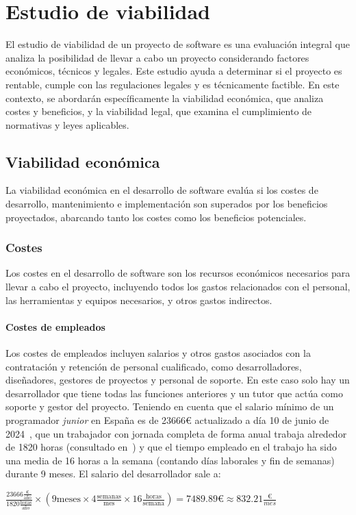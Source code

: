\section{Estudio de viabilidad}
El estudio de viabilidad de un proyecto de software es una evaluación integral que analiza la posibilidad de llevar a cabo un proyecto considerando factores económicos, técnicos y legales. Este estudio ayuda a determinar si el proyecto es rentable, cumple con las regulaciones legales y es técnicamente factible. En este contexto, se abordarán específicamente la viabilidad económica, que analiza costes y beneficios, y la viabilidad legal, que examina el cumplimiento de normativas y leyes aplicables.

\subsection{Viabilidad económica}
La viabilidad económica en el desarrollo de software evalúa si los costes de desarrollo, mantenimiento e implementación son superados por los beneficios proyectados, abarcando tanto los costes como los beneficios potenciales.

\subsubsection{Costes}
Los costes en el desarrollo de software son los recursos económicos necesarios para llevar a cabo el proyecto, incluyendo todos los gastos relacionados con el personal, las herramientas y equipos necesarios, y otros gastos indirectos.

\paragraph{Costes de empleados}

Los costes de empleados incluyen salarios y otros gastos asociados con la contratación y retención de personal cualificado, como desarrolladores, diseñadores, gestores de proyectos y personal de soporte. En este caso solo hay un desarrollador que tiene todas las funciones anteriores y un tutor que actúa como soporte y gestor del proyecto. Teniendo en cuenta que el salario mínimo de un programador \textit{junior} en España es de 23666€ actualizado a día 10 de junio de 2024~\cite{salario}, que un trabajador con jornada completa de forma anual trabaja alrededor de 1820 horas (consultado en~\cite{jornadaAnual}) y que el tiempo  empleado en el trabajo ha sido una media de 16 horas a la semana (contando días laborales y fin de semanas) durante 9 meses. El salario del desarrollador sale a:
\begin{center}
	$ \frac{23666\frac{\text{€}}{\text{año}}}{1820\frac{\text{horas}}{\text{año}}} \times (9\text{meses} \times 4\frac{\text{semanas}}{\text{mes}} \times 16\frac{\text{horas}}{\text{semana}}) = 7489.89\text{€} \approx 832.21\frac{\text{€}}{mes}$
\end{center}

